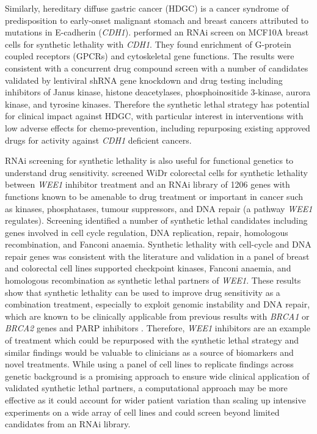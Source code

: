 Similarly, hereditary diffuse gastric cancer (HDGC) is a cancer syndrome of predisposition to early-onset malignant stomach and breast cancers attributed to mutations in E-cadherin (\textit{CDH1}). \citet{Telford2015} performed an RNAi screen on MCF10A breast cells for synthetic lethality with \textit{CDH1}. They found enrichment of G-protein coupled receptors (GPCRs) and cytoskeletal gene functions. The results were consistent with a concurrent drug compound screen with a number of candidates validated by lentiviral shRNA gene knockdown and drug testing including inhibitors of Janus kinase, histone deacetylases, phosphoinositide 3-kinase, aurora kinase, and tyrosine kinases. Therefore the synthetic lethal strategy has potential for clinical impact against HDGC, with particular interest in interventions with low adverse effects for chemo-prevention, including repurposing existing approved drugs for activity against \textit{CDH1} deficient cancers.  

RNAi screening for synthetic lethality is also useful for functional genetics to understand drug sensitivity. \citet{Aarts2015} screened WiDr colorectal cells for synthetic lethality between \textit{WEE1} inhibitor treatment and an RNAi library of 1206 genes with functions known to be amenable to drug treatment or important in cancer such as kinases, phosphatases, tumour suppressors, and DNA repair (a pathway \textit{WEE1} regulates). Screening identified a number of synthetic lethal candidates including genes involved in cell cycle regulation, DNA replication, repair, homologous recombination, and Fanconi anaemia. Synthetic lethality with cell-cycle and DNA repair genes was consistent with the literature and validation in a panel of breast and colorectal cell lines supported checkpoint kinases, Fanconi anaemia, and homologous recombination as synthetic lethal partners of \textit{WEE1}. These results show that synthetic lethality can be used to improve drug sensitivity as a combination treatment, especially to exploit genomic instability and DNA repair, which are known to be clinically applicable from previous results with \textit{BRCA1} or \textit{BRCA2} genes and PARP inhibitors \citep{Lord2014}. Therefore, \textit{WEE1} inhibitors are an example of treatment which could be repurposed with the synthetic lethal strategy and similar findings would be valuable to clinicians as a source of biomarkers and novel treatments. While using a panel of cell lines to replicate findings across genetic background is a promising approach to ensure wide clinical application of validated synthetic lethal partners, a computational approach may be more effective as it could account for wider patient variation than scaling up intensive experiments on a wide array of cell lines and could screen beyond limited candidates from an RNAi library.  

